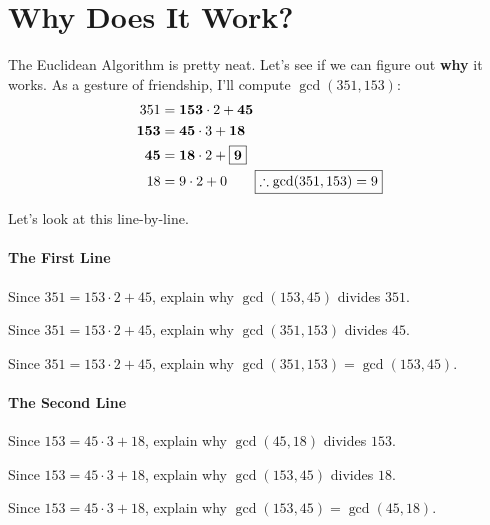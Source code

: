 \newpage
\section{Why Does It Work?}\label{A:GCDwork}

The Euclidean Algorithm is pretty
neat. Let's see if we can figure out \textbf{why} it works. As a gesture of friendship, I'll compute $\gcd(351,153)$:
\begin{align*}
351 &= \boldsymbol{153}\cdot 2 + \boldsymbol{45}\\ 
\boldsymbol{153} &= \boldsymbol{45}\cdot 3 + \boldsymbol{18}\\
\boldsymbol{45} &= \boldsymbol{18}\cdot 2 + \fbox{$\boldsymbol{9}$}\\
18 &= 9\cdot 2 + 0 \qquad \fbox{$\therefore \gcd(351,153) = 9$}
\end{align*}

Let's look at this line-by-line.

\paragraph{The First Line}
\begin{prob}
Since $351 = 153\cdot 2 + 45$, explain why $\gcd(153,45)$ divides $351$.
\end{prob}

\begin{prob}
Since $351 = 153\cdot 2 + 45$, explain why $\gcd(351,153)$ divides $45$.
\end{prob}

\begin{prob}
Since $351 = 153\cdot 2 + 45$, explain why $\gcd(351,153) = \gcd(153,45)$.
\end{prob}


\paragraph{The Second Line}
\begin{prob}
Since $153 = 45\cdot 3 + 18$, explain why $\gcd(45,18)$ divides $153$.
\end{prob}

\begin{prob}
Since $153 = 45\cdot 3 + 18$, explain why $\gcd(153,45)$ divides $18$.
\end{prob}

\begin{prob}
Since $153 = 45\cdot 3 + 18$, explain why $\gcd(153,45) = \gcd(45,18)$.
\end{prob}


